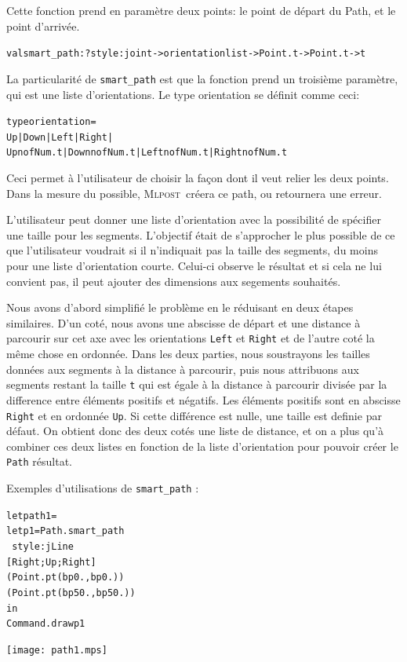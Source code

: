 \documentclass[a4paper,12pt]{article}
\newcommand{\mlpost}{\textsc{Mlpost}}
\begin{document}
Cette fonction prend en paramètre deux points: le point de départ du Path, et le point d'arrivée. 
\begin{alltt}
  val smart_path : ?style:joint -> orientation list -> Point.t -> Point.t -> t
\end{alltt}
\bigskip 

La particularité de \texttt{smart\_path} est que la fonction prend un troisième paramètre, qui est une liste d'orientations.
Le type orientation se définit comme ceci:
\begin{alltt}
  type orientation =
  Up | Down | Left | Right |
  Upn of Num.t | Downn of Num.t | Leftn of Num.t | Rightn of Num.t
\end{alltt}

Ceci permet à l'utilisateur de choisir la façon dont il veut relier les deux points. Dans la mesure du possible, \mlpost\ créera ce path, ou retournera une erreur. 

L'utilisateur peut donner une liste d'orientation avec la possibilité de spécifier une taille pour les segments.
L'objectif était de s'approcher le plus possible de ce que l'utilisateur voudrait si il n'indiquait pas la taille des segments, du moins pour une liste d'orientation courte. 
Celui-ci observe le résultat et si cela ne lui convient pas, il peut ajouter des dimensions aux segements souhaités.
\bigskip

Nous avons d'abord simplifié le problème en le réduisant en deux étapes similaires.
D'un coté, nous avons une abscisse de départ et une distance à parcourir sur cet axe avec les orientations \texttt{Left} et \texttt{Right} et de l'autre coté la même chose en ordonnée.
Dans les deux parties, nous soustrayons les tailles données aux segments à la distance à parcourir, puis nous attribuons aux segments restant la taille \texttt{t} qui est égale à la distance à parcourir divisée par la difference entre éléments positifs et négatifs.
Les éléments positifs sont en abscisse \texttt{Right} et en ordonnée \texttt{Up}. Si cette différence est nulle, une taille est definie par défaut. 
On obtient donc des deux cotés une liste de distance, et on a plus qu'à combiner ces deux listes en fonction de la liste d'orientation pour pouvoir créer le \texttt{Path} résultat.


\bigskip 

Exemples d'utilisations de \texttt{smart\_path} :
\bigskip

\begin{minipage}{0.5\linewidth}
  \begin{alltt}
    let path1 = 
    let p1 = Path.smart_path 
    ~style:jLine
    [Right;Up;Right]
    (Point.pt (bp 0.,bp 0.)) 
    (Point.pt (bp 50.,bp 50.))
    in
    Command.draw p1
  \end{alltt}
\end{minipage}
\begin{minipage}{0.5\linewidth}
\begin{center}
\texttt{[image: path1.mps]}
\end{center}
\end{minipage}
\end{document}
